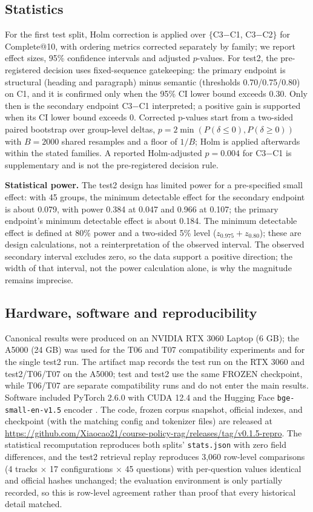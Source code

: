 \documentclass[conference]{IEEEtran}
\begin{document}
\subsection{Statistics}
For the first test split, Holm correction is applied over $\{$C3$-$C1, C3$-$C2$\}$ for Complete@10, with ordering metrics corrected separately by family; we report effect sizes, 95\% confidence intervals and adjusted $p$-values. For test2, the pre-registered decision uses fixed-sequence gatekeeping: the primary endpoint is structural (heading and paragraph) minus semantic (thresholds 0.70/0.75/0.80) on C1, and it is confirmed only when the 95\% CI lower bound exceeds 0.30. Only then is the secondary endpoint C3$-$C1 interpreted; a positive gain is supported when its CI lower bound exceeds 0. Corrected p-values start from a two-sided paired bootstrap over group-level deltas, $p=2\min(P(\delta\le0),P(\delta\ge0))$ with $B=2000$ shared resamples and a floor of $1/B$; Holm is applied afterwards within the stated families. A reported Holm-adjusted $p=0.004$ for C3$-$C1 is supplementary and is not the pre-registered decision rule.

\textbf{Statistical power.}
The test2 design has limited power for a pre-specified small effect: with 45 groups, the minimum detectable effect for the secondary endpoint is about 0.079, with power 0.384 at 0.047 and 0.966 at 0.107; the primary endpoint's minimum detectable effect is about 0.184. The minimum detectable effect is defined at 80\% power and a two-sided 5\% level ($z_{0.975}+z_{0.80}$); these are design calculations, not a reinterpretation of the observed interval. The observed secondary interval excludes zero, so the data support a positive direction; the width of that interval, not the power calculation alone, is why the magnitude remains imprecise.

\subsection{Hardware, software and reproducibility}
Canonical results were produced on an NVIDIA RTX 3060 Laptop (6 GB); the A5000 (24 GB) was used for the T06 and T07 compatibility experiments and for the single test2 run. The artifact map records the test run on the RTX 3060 and test2/T06/T07 on the A5000; test and test2 use the same FROZEN checkpoint, while T06/T07 are separate compatibility runs and do not enter the main results. Software included PyTorch 2.6.0 with CUDA 12.4 and the Hugging Face \texttt{bge-small-en-v1.5} encoder \cite{bge_small}. The code, frozen corpus snapshot, official indexes, and checkpoint (with the matching config and tokenizer files) are released at \url{https://github.com/Xiaocao21/course-policy-rag/releases/tag/v0.1.5-repro}. The statistical recomputation reproduces both splits' \texttt{stats.json} with zero field differences, and the test2 retrieval replay reproduces 3,060 row-level comparisons (4 tracks $\times$ 17 configurations $\times$ 45 questions) with per-question values identical and official hashes unchanged; the evaluation environment is only partially recorded, so this is row-level agreement rather than proof that every historical detail matched.
\end{document}
